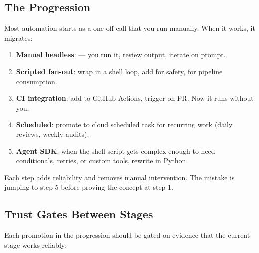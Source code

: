 \subsection*{The Progression}

Most automation starts as a one-off  call that you
run manually. When it works, it migrates:

\begin{enumerate}
  \item \textbf{Manual headless}:  ---
    you run it, review output, iterate on prompt.
  \item \textbf{Scripted fan-out}: wrap in a shell loop, add
     for safety, 
    for pipeline consumption.
  \item \textbf{CI integration}: add to GitHub Actions, trigger on PR.
    Now it runs without you.
  \item \textbf{Scheduled}: promote to cloud scheduled task for
    recurring work (daily reviews, weekly audits).
  \item \textbf{Agent SDK}: when the shell script gets complex enough
    to need conditionals, retries, or custom tools, rewrite in Python.
\end{enumerate}

\noindent Each step adds reliability and removes manual intervention.
The mistake is jumping to step 5 before proving the concept at step 1.

\subsection*{Trust Gates Between Stages}


Each promotion in the progression should be gated on evidence
that the current stage works reliably:

